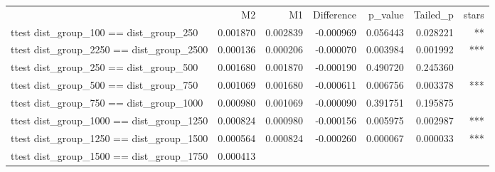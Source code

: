 \documentclass{article}
\begin{document}
\begin{table}[!h]
\centering
\begin{tabular}{lllllll}
\cline{1-7}
\multicolumn{1}{c}{} &
  \multicolumn{1}{|r}{M2} &
  \multicolumn{1}{r}{M1} &
  \multicolumn{1}{r}{Difference} &
  \multicolumn{1}{r}{p\_value} &
  \multicolumn{1}{r}{Tailed\_p} &
  \multicolumn{1}{r}{stars} \\
\cline{1-7}
\multicolumn{1}{l}{ttest dist\_group\_100 == dist\_group\_250} &
  \multicolumn{1}{|r}{0.001870} &
  \multicolumn{1}{r}{0.002839} &
  \multicolumn{1}{r}{-0.000969} &
  \multicolumn{1}{r}{0.056443} &
  \multicolumn{1}{r}{0.028221} &
  \multicolumn{1}{r}{**} \\
\multicolumn{1}{l}{ttest dist\_group\_2250 == dist\_group\_2500} &
  \multicolumn{1}{|r}{0.000136} &
  \multicolumn{1}{r}{0.000206} &
  \multicolumn{1}{r}{-0.000070} &
  \multicolumn{1}{r}{0.003984} &
  \multicolumn{1}{r}{0.001992} &
  \multicolumn{1}{r}{***} \\
\multicolumn{1}{l}{ttest dist\_group\_250 == dist\_group\_500} &
  \multicolumn{1}{|r}{0.001680} &
  \multicolumn{1}{r}{0.001870} &
  \multicolumn{1}{r}{-0.000190} &
  \multicolumn{1}{r}{0.490720} &
  \multicolumn{1}{r}{0.245360} &
  \multicolumn{1}{r}{} \\
\multicolumn{1}{l}{ttest dist\_group\_500 == dist\_group\_750} &
  \multicolumn{1}{|r}{0.001069} &
  \multicolumn{1}{r}{0.001680} &
  \multicolumn{1}{r}{-0.000611} &
  \multicolumn{1}{r}{0.006756} &
  \multicolumn{1}{r}{0.003378} &
  \multicolumn{1}{r}{***} \\
\multicolumn{1}{l}{ttest dist\_group\_750 == dist\_group\_1000} &
  \multicolumn{1}{|r}{0.000980} &
  \multicolumn{1}{r}{0.001069} &
  \multicolumn{1}{r}{-0.000090} &
  \multicolumn{1}{r}{0.391751} &
  \multicolumn{1}{r}{0.195875} &
  \multicolumn{1}{r}{} \\
\multicolumn{1}{l}{ttest dist\_group\_1000 == dist\_group\_1250} &
  \multicolumn{1}{|r}{0.000824} &
  \multicolumn{1}{r}{0.000980} &
  \multicolumn{1}{r}{-0.000156} &
  \multicolumn{1}{r}{0.005975} &
  \multicolumn{1}{r}{0.002987} &
  \multicolumn{1}{r}{***} \\
\multicolumn{1}{l}{ttest dist\_group\_1250 == dist\_group\_1500} &
  \multicolumn{1}{|r}{0.000564} &
  \multicolumn{1}{r}{0.000824} &
  \multicolumn{1}{r}{-0.000260} &
  \multicolumn{1}{r}{0.000067} &
  \multicolumn{1}{r}{0.000033} &
  \multicolumn{1}{r}{***} \\
\multicolumn{1}{l}{ttest dist\_group\_1500 == dist\_group\_1750} &
  \multicolumn{1}{|r}{0.000413} &

\end{tabular}
\end{table}
\end{document}
